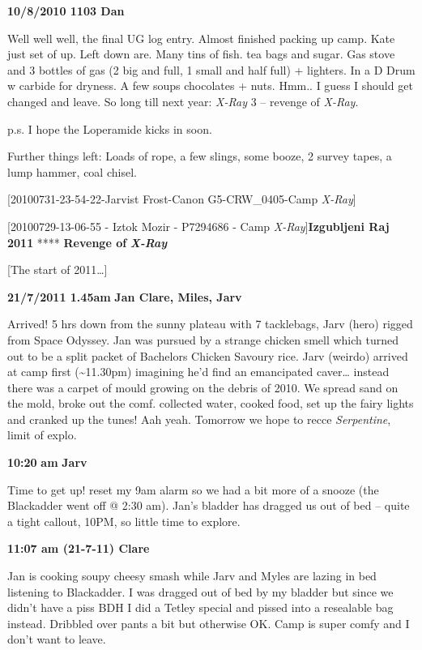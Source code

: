 \textbf{10/8/2010 1103 Dan}

Well well well, the final UG log entry. Almost finished packing up camp.
Kate just set of up. Left down are. Many tins of fish. tea bags and
sugar. Gas stove and 3 bottles of gas (2 big and full, 1 small and half
full) + lighters. In a D Drum w carbide for dryness. A few soups
chocolates + nuts. Hmm.. I guess I should get changed and leave. So long
till next year: \emph{X-Ray} 3 -- revenge of \emph{X-Ray}.

p.s. I hope the Loperamide kicks in soon.

Further things left: Loads of rope, a few slings, some booze, 2 survey
tapes, a lump hammer, coal chisel.

{[}20100731-23-54-22-Jarvist Frost-Canon G5-CRW\_0405-Camp
\emph{X-Ray}{]}

{[}20100729-13-06-55 - Iztok Mozir - P7294686 - Camp
\emph{X-Ray}{]}\textbf{Izgubljeni Raj 2011} **** \textbf{Revenge of}
\textbf{\emph{X-Ray}}

{[}The start of 2011\ldots{}{]}

\textbf{21/7/2011 1.45am} \textbf{Jan Clare, Miles, Jarv}

Arrived! 5 hrs down from the sunny plateau with 7 tacklebags, Jarv
(hero) rigged from Space Odyssey. Jan was pursued by a strange chicken
smell which turned out to be a split packet of Bachelors Chicken Savoury
rice. Jarv (weirdo) arrived at camp first (\textasciitilde 11.30pm)
imagining he'd find an emancipated caver\ldots{} instead there was a
carpet of mould growing on the debris of 2010. We spread sand on the
mold, broke out the comf. collected water, cooked food, set up the fairy
lights and cranked up the tunes! Aah yeah. Tomorrow we hope to recce
\emph{Serpentine}, limit of explo.

\textbf{10:20} \textbf{am} \textbf{Jarv}

Time to get up! reset my 9am alarm so we had a bit more of a snooze (the
Blackadder went off @ 2:30 am). Jan's bladder has dragged us out of bed
-- quite a tight callout, 10PM, so little time to explore.

\textbf{11:07 am (21-7-11) Clare}

Jan is cooking soupy cheesy smash while Jarv and Myles are lazing in bed
listening to Blackadder. I was dragged out of bed by my bladder but
since we didn't have a piss BDH I did a Tetley special and pissed into a
resealable bag instead. Dribbled over pants a bit but otherwise OK. Camp
is super comfy and I don't want to leave.

